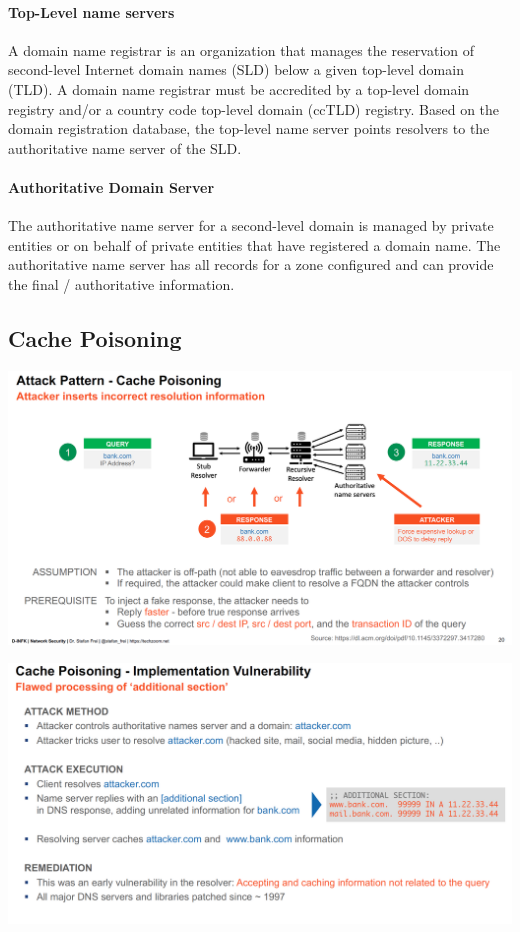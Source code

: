 \paragraph{Top-Level name servers}
A domain name registrar is an organization that manages the reservation of second-level Internet domain names (SLD) below a given top-level domain (TLD). A domain name registrar must be accredited by a top-level domain registry and/or a country code top-level domain (ccTLD) registry. Based on the domain registration database, the top-level name server points resolvers to the authoritative name server of the SLD.

\paragraph{Authoritative Domain Server}
The authoritative name server for a second-level domain is managed by private entities or on behalf of private entities that have registered a domain name. The authoritative name server has all records for a zone configured and can provide the final / authoritative information.

\subsection{Cache Poisoning}
\begin{minipage}{\linewidth}
    \centering      
    \includegraphics[width=\linewidth]{Figures/DNS_cache_poisoning.PNG} 
\end{minipage}

\begin{minipage}{\linewidth}
    \centering      
    \includegraphics[width=\linewidth]{Figures/DNS_additional_section.PNG} 
\end{minipage}

